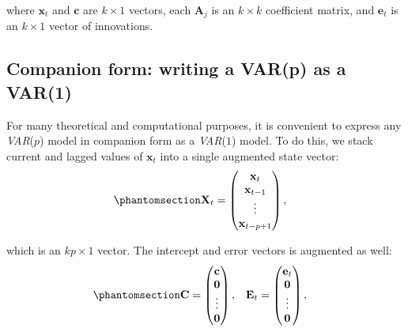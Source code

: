\documentclass[
  letterpaper,
  DIV=11,
  numbers=noendperiod]{scrreprt}
\begin{document}
where \(\mathbf{x}_t\) and \(\mathbf{c}\) are \(k \times 1\) vectors,
each \(\mathbf{A}_j\) is an \(k \times k\) coefficient matrix, and
\(\mathbf{e}_t\) is an \(k \times 1\) vector of innovations.

\subsection*{Companion form: writing a VAR(p) as a
VAR(1)}\label{companion-form-writing-a-varp-as-a-var1}

For many theoretical and computational purposes, it is convenient to
express any \emph{VAR}(\(p\)) model in companion form as a
\emph{VAR}(\(1\)) model. To do this, we stack current and lagged values
of \(\mathbf{x}_t\) into a single augmented state vector:
\begin{equation}\protect\phantomsection\label{eq-gen-0091}{  
\begin{align}
    \mathbf{X}_t &=
    \begin{pmatrix}
        \mathbf{x}_t \\
        \mathbf{x}_{t-1} \\
        \vdots \\
        \mathbf{x}_{t-p+1}
    \end{pmatrix},
\end{align}
}\end{equation}

which is an \(kp \times 1\) vector. The intercept and error vectors is
augmented as well:
\begin{equation}\protect\phantomsection\label{eq-gen-0092}{  
\begin{align}
    \mathbf{C} &=
    \begin{pmatrix}
        \mathbf{c} \\
        \mathbf{0} \\
        \vdots \\
        \mathbf{0}
    \end{pmatrix},
    &
    \mathbf{E}_t &=
    \begin{pmatrix}
        \mathbf{e}_t \\
        \mathbf{0} \\
        \vdots \\
        \mathbf{0}
    \end{pmatrix},
\end{align}
}\end{equation}
\end{document}
